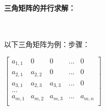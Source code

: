 \documentclass[UTF8]{article}%
\begin{document}
\paragraph{三角矩阵的并行求解：}~{}

以下三角矩阵为例：步骤：

$
\begin{bmatrix}
    a_{1,1} & 0       & 0       & ... & 0      \\
    a_{2,1} & a_{2,2} & 0       & ... & 0      \\
    a_{3,1} & a_{2,3} & a_{3,3} & ... & 0      \\
    ...                                        \\
    a_{m,1} & a_{m,2} & a_{m,3} & ... & a_{m,n}\\
\end{bmatrix}
$


\end{document}
